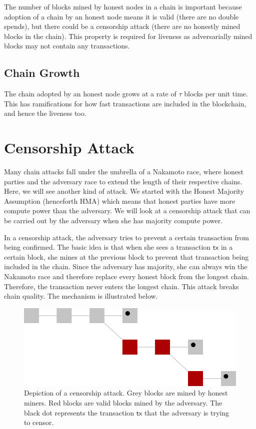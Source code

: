 The number of blocks mined by honest nodes in a chain is important because adoption of a chain by an honest node means it is valid (there are no double spends), but there could be a censorship attack (there are no honestly mined blocks in the chain).
This property is required for liveness as adversarially mined blocks may not contain any transactions.

\subsection{Chain Growth}
The chain adopted by an honest node grows at a rate of $\tau$ blocks per unit time. This has ramifications for how fast transactions are included in the blockchain, and hence the liveness too.
\section{Censorship Attack}
Many chain attacks fall under the umbrella of a Nakamoto race, where honest parties and the adversary race to extend the length of their respective chains. Here, we will see another kind of attack. We started with the Honest Majority Assumption (henceforth HMA) which means that honest parties have more compute power than the adversary. We will look at a censorship attack that can be carried out by the adversary when she has majority compute power.

In a censorship attack, the adversary tries to prevent a certain transaction from being confirmed. The basic idea is that when she sees a transaction $\mathsf{tx}$ in a certain block, she mines at the previous block to prevent that transaction being included in the chain.
Since the adversary has majority, she can always win the Nakamoto race and therefore replace every honest block from the longest chain.
Therefore, the transaction never enters the longest chain.
This attack breaks chain quality.
The mechanism is illustrated below.


 \begin{figure}[h!]

\includegraphics[scale=0.5]{figures/censorship.png}
 \caption{Depiction of a censorship attack. Grey blocks are mined by honest miners. Red blocks are valid blocks mined by the adversary. The black dot represents the transaction $\mathsf{tx}$ that the adversary is trying to censor. }
\end{figure}

